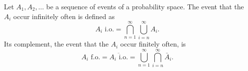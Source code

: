 Let $A_1, A_2, \ldots$ be a sequence of events of a probability space. The event that the $A_i$ occur infinitely often is defined as
$$A_i \text{ i.o.} = \bigcap_{n=1}^{\infty} \bigcup_{i=n}^{\infty} A_i.$$
Its complement, the event that the $A_i$ occur finitely often, is
$$A_i \text{ f.o.} = \overline{A_i \text{ i.o.}} = \bigcup_{n=1}^{\infty} \bigcap_{i=n}^{\infty} \bar{A}_i.$$
